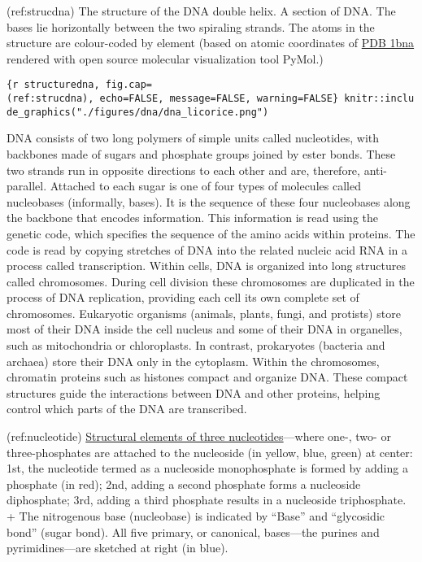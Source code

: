 (ref:strucdna) The structure of the DNA double helix. A section of DNA.
The bases lie horizontally between the two spiraling strands. The atoms
in the structure are colour-coded by element (based on atomic
coordinates of \href{https://www.rcsb.org/structure/1bna}{PDB 1bna}
rendered with open source molecular visualization tool PyMol.)

\texttt{\{r\ structuredna,\ fig.cap=\textquotesingle{}(ref:strucdna)\textquotesingle{},\ echo=FALSE,\ message=FALSE,\ warning=FALSE\}\ knitr::include\_graphics("./figures/dna/dna\_licorice.png")}

DNA consists of two long polymers of simple units called nucleotides,
with backbones made of sugars and phosphate groups joined by ester
bonds. These two strands run in opposite directions to each other and
are, therefore, anti-parallel. Attached to each sugar is one of four
types of molecules called nucleobases (informally, bases). It is the
sequence of these four nucleobases along the backbone that encodes
information. This information is read using the genetic code, which
specifies the sequence of the amino acids within proteins. The code is
read by copying stretches of DNA into the related nucleic acid RNA in a
process called transcription. Within cells, DNA is organized into long
structures called chromosomes. During cell division these chromosomes
are duplicated in the process of DNA replication, providing each cell
its own complete set of chromosomes. Eukaryotic organisms (animals,
plants, fungi, and protists) store most of their DNA inside the cell
nucleus and some of their DNA in organelles, such as mitochondria or
chloroplasts. In contrast, prokaryotes (bacteria and archaea) store
their DNA only in the cytoplasm. Within the chromosomes, chromatin
proteins such as histones compact and organize DNA. These compact
structures guide the interactions between DNA and other proteins,
helping control which parts of the DNA are transcribed.

(ref:nucleotide)
\href{https://commons.wikimedia.org/wiki/File:Nucleotides_1.svg}{Structural
elements of three nucleotides}---where one-, two- or three-phosphates
are attached to the nucleoside (in yellow, blue, green) at center: 1st,
the nucleotide termed as a nucleoside monophosphate is formed by adding
a phosphate (in red); 2nd, adding a second phosphate forms a nucleoside
diphosphate; 3rd, adding a third phosphate results in a nucleoside
triphosphate. + The nitrogenous base (nucleobase) is indicated by
``Base'' and ``glycosidic bond'' (sugar bond). All five primary, or
canonical, bases---the purines and pyrimidines---are sketched at right
(in blue).

